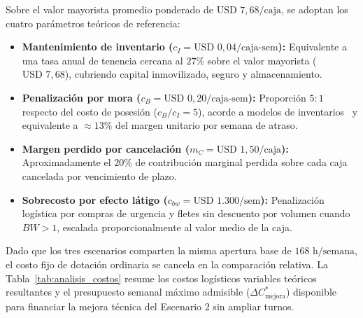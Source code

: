 \documentclass[11pt, a4paper]{article}
\begin{document}
Sobre el valor mayorista promedio ponderado de $\text{USD } 7{,}68/\text{caja}$, se adoptan los cuatro parámetros teóricos de referencia:
\begin{itemize}[leftmargin=0.6cm]
    \item \textbf{Mantenimiento de inventario ($c_I = \text{USD } 0{,}04/\text{caja-sem}$):} Equivalente a una tasa anual de tenencia cercana al $27\%$ sobre el valor mayorista ($\text{USD } 7{,}68$), cubriendo capital inmovilizado, seguro y almacenamiento.
    \item \textbf{Penalización por mora ($c_B = \text{USD } 0{,}20/\text{caja-sem}$):} Proporción $5:1$ respecto del costo de posesión ($c_B / c_I = 5$), acorde a modelos de inventarios~\cite{lawkelton} y equivalente a $\approx 13\%$ del margen unitario por semana de atraso.
    \item \textbf{Margen perdido por cancelación ($m_C = \text{USD } 1{,}50/\text{caja}$):} Aproximadamente el $20\%$ de contribución marginal perdida sobre cada caja cancelada por vencimiento de plazo.
    \item \textbf{Sobrecosto por efecto látigo ($c_{bw} = \text{USD } 1.300/\text{sem}$):} Penalización logística por compras de urgencia y fletes sin descuento por volumen cuando $BW>1$, escalada proporcionalmente al valor medio de la caja.
\end{itemize}

Dado que los tres escenarios comparten la misma apertura base de $168\text{ h/semana}$, el costo fijo de dotación ordinaria se cancela en la comparación relativa. La Tabla~\ref{tab:analisis_costos} resume los costos logísticos variables teóricos resultantes y el presupuesto semanal máximo admisible ($\Delta C_{\text{mejora}}^*$) disponible para financiar la mejora técnica del Escenario 2 sin ampliar turnos.
\end{document}
